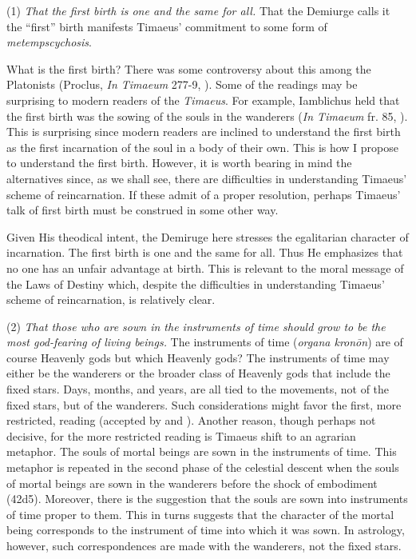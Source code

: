 (1) \emph{That the first birth is one and the same for all.} That the Demiurge calls it the ``first'' birth manifests Timaeus' commitment to some form of \emph{metempscychosis}.

What is the first birth? There was some controversy about this among the Platonists (Proclus, \emph{In Timaeum} 277-9, \citealt{Diehl:1903re}). Some of the readings may be surprising to modern readers of the \emph{Timaeus}. For example, Iamblichus held that the first birth was the sowing of the souls in the wanderers (\emph{In Timaeum} fr. 85, \citealt{Dillon:1973qv}). This is surprising since modern readers are inclined to understand the first birth as the first incarnation of the soul in a body of their own. This is how I propose to understand the first birth. However, it is worth bearing in mind the alternatives since, as we shall see, there are difficulties in understanding Timaeus' scheme of reincarnation. If these admit of a proper resolution, perhaps Timaeus' talk of first birth must be construed in some other way.

Given His theodical intent, the Demiruge here stresses the egalitarian character of incarnation. The first birth is one and the same for all. Thus He emphasizes that no one has an unfair advantage at birth. This is relevant to the moral message of the Laws of Destiny which, despite the difficulties in understanding Timaeus' scheme of reincarnation, is relatively clear.

(2) \emph{That those who are sown in the instruments of time should grow to be the most god-fearing of living beings.} The instruments of time (\emph{organa kronōn}) are of course Heavenly gods but which Heavenly gods? The instruments of time may either be the wanderers or the broader class of Heavenly gods that include the fixed stars. Days, months, and years, are all tied to the movements, not of the fixed stars, but of the wanderers. Such considerations might favor the first, more restricted, reading (accepted by \citealt[143 n4]{Archer-Hind:1888qd} and \citealt[258--9]{Taylor:1928qb}). Another reason, though perhaps not decisive, for the more restricted reading is Timaeus shift to an agrarian metaphor. The souls of mortal beings are sown in the instruments of time. This metaphor is repeated in the second phase of the celestial descent when the souls of mortal beings are sown in the wanderers before the shock of embodiment (42d5). Moreover, there is the suggestion that the souls are sown into instruments of time proper to them. This in turns suggests that the character of the mortal being corresponds to the instrument of time into which it was sown. In astrology, however, such correspondences are made with the wanderers, not the fixed stars.

